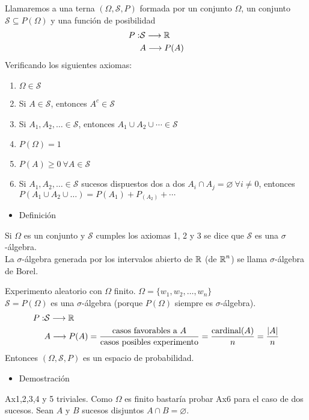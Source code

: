 Llamaremos  a una terna $(\Omega, \mathcal{S}, P)$ formada por un conjunto $\Omega$, un conjunto $\mathcal{S}\subseteq P(\Omega)$ y una función de posibilidad \begin{align*}
	P:&\mathcal{S}\longrightarrow\operatorname{\mathbb{R}}\\
	&A\longrightarrow P(A)
\end{align*}
Verificando los siguientes axiomas:
\begin{enumerate}[label=Ax\arabic*)]
	\item $\Omega\in\mathcal{S}$
	\item Si $A\in\mathcal{S}$, entonces $A^c\in\mathcal{S}$
	\item Si $A_1,A_2,\dots\in\mathcal{S}$, entonces $A_1\cup A_2\cup \cdots\in\mathcal{S}$
	\item $P(\Omega)=1$
	\item $P(A)\ge0\:\forall A\in\mathcal{S}$
	\item Si $A_1,A_2,\dots\in\mathcal{S}$ sucesos dispuestos dos a dos $A_i\cap A_j=\varnothing\:\forall i\neq0$, entonces $P(A_1\cup A_2\cup\dots)=P(A_1)+P_(A_2)+\cdots$
\end{enumerate}
\begin{itemize}[label=\color{red}\textbullet, leftmargin=*]
	\item \color{lightblue}Definición
\end{itemize}
Si $\Omega$ es un conjunto y $\mathcal{S}$ cumples los axiomas 1, 2 y 3 se dice que $\mathcal{S}$ es una $\sigma$-álgebra.\\
La $\sigma$-álgebra generada por los intervalos abierto de $\operatorname{\mathbb{R}}$ (de $\operatorname{\mathbb{R}}^n$) se llama $\sigma$-álgebra de Borel.

\Ej

Experimento aleatorio con $\Omega$ finito. $\Omega=\{w_1,w_2,\dots,w_n\}$\\
$\mathcal{S}=P(\Omega)$ es una $\sigma$-álgebra (porque $P(\Omega)$ siempre es $\sigma$-álgebra).\begin{align*}
	P:&\mathcal{S}\longrightarrow\operatorname{\mathbb{R}}\\
	&A\longrightarrow P(A)=\dfrac{\text{casos favorables a $A$}}{\text{casos posibles experimento}}=\dfrac{\mathrm{cardinal}(A)}{n}=\dfrac{|A|}{n}
\end{align*}Entonces $(\Omega,\mathcal{S},P)$ es un espacio de probabilidad.
\begin{itemize}[label=\color{red}\textbullet, leftmargin=*]
	\item \color{lightblue}Demostración
\end{itemize}
Ax1,2,3,4 y 5 triviales. Como $\Omega$ es finito bastaría probar Ax6 para el caso de dos sucesos. Sean $A$ y $B$ sucesos disjuntos $A\cap B=\varnothing$.


